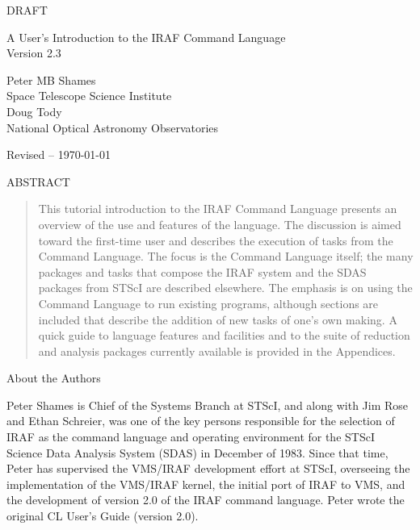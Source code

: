 \begin{titlepage} \vspace*{1.0in}

\begin{center} \huge
DRAFT\\ \vspace*{0.5in} \large \bf

A User's Introduction to the IRAF Command Language \\ \medskip
Version 2.3 \\

\bigskip

\smcaps Peter MB Shames\\
\tenrm Space Telescope Science Institute\\
\medskip
\smcaps Doug Tody\\
\tenrm National Optical Astronomy Observatories\\
\vskip 1cm

Revised  -- \today\\ \vskip 1cm

\bldcn ABSTRACT\\ \medskip
\end{center} \large

\begin{quotation} \noindent
This tutorial introduction to the IRAF Command Language
presents an overview of the use and features of the language.
The discussion is aimed toward the first-time
user and describes the execution of tasks from the Command
Language.  The focus is the Command Language itself;
the many packages and tasks that compose the IRAF system and the 
SDAS packages from STScI are described elsewhere.  The emphasis is
on using the Command Language to run existing programs, although
sections are included that describe the addition of new tasks
of one's own making. A quick guide to language features and facilities
and to the suite of reduction and analysis packages currently available
is provided in the Appendices.
\end{quotation}
\end{titlepage}

\pagestyle{empty}
\newpage
\thispagestyle{empty}

\begin{center} \vspace*{1in}
\large About the Authors
\end{center}
\vskip 1cm
\rm

\noindent
Peter Shames is Chief of the Systems Branch at STScI, and along with Jim Rose
and Ethan Schreier, was one of the key persons responsible for the selection
of IRAF as the command language and operating environment for the STScI
Science Data Analysis System (SDAS) in December of 1983.  Since that time,
Peter has supervised the VMS/IRAF development effort at STScI, overseeing the
implementation of the VMS/IRAF kernel, the initial port of IRAF to VMS,
and the development of version 2.0 of the IRAF command language.
Peter wrote the original CL User's Guide (version 2.0).


